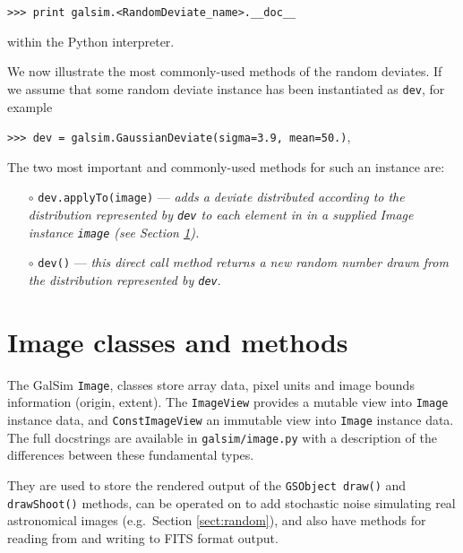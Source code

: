 \documentclass[preprint,11pt]{aastex}
\newcommand{\gsobject}{{\tt GSObject}}
\begin{document}
{\tt >>> print galsim.<RandomDeviate\_name>.\_\_doc\_\_}

within the Python interpreter.

We now illustrate the most commonly-used methods of the random deviates.
If we assume that some random deviate instance 
has been instantiated as \texttt{dev},  for example

{\tt >>> dev = galsim.GaussianDeviate(sigma=3.9, mean=50.)},

The two most important and commonly-used methods for such an
instance are:
\begin{itemize}

\item[$\circ$] \texttt{dev.applyTo(image)} --- \emph{adds a deviate
  distributed according to the distribution represented by 
\texttt{dev} to each element in in a supplied Image instance \texttt{image} (see Section \ref{sect:image}).}

\item[$\circ$] \texttt{dev()} --- \emph{this direct call method
    returns a new random number drawn from the distribution
    represented by \texttt{dev}}.

\end{itemize}

\section{Image classes and methods}\label{sect:image}
The GalSim \texttt{Image}, classes store array data, pixel units and
image bounds information (origin, extent).  The \texttt{ImageView}
provides a mutable view into \texttt{Image} instance data, and
\texttt{ConstImageView} an immutable view into
\texttt{Image} instance data.  The full docstrings are available in
\texttt{galsim/image.py} with a description of the differences between
these fundamental types.

They are used to store the rendered output of the
\gsobject~\texttt{draw()} and \texttt{drawShoot()} methods, can be
operated on to add stochastic noise simulating real astronomical
images (e.g.\ Section \ref{sect:random}), and also have methods for
reading from and writing to FITS format output.
\end{document}
